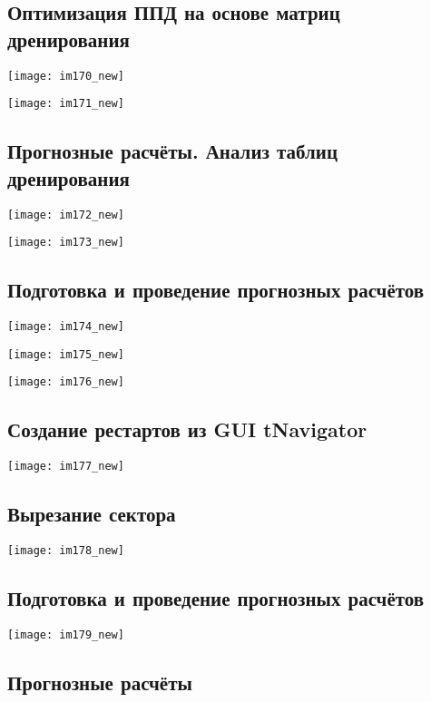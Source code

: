 \documentclass[main.tex]{subfiles}
\begin{document}
\subsection{Оптимизация ППД на основе матриц дренирования}

\texttt{[image: im170\_new]}

\texttt{[image: im171\_new]}

\subsection{Прогнозные расчёты. Анализ таблиц дренирования}

\texttt{[image: im172\_new]}

\texttt{[image: im173\_new]}

\subsection{Подготовка и проведение прогнозных расчётов}

\texttt{[image: im174\_new]}

\texttt{[image: im175\_new]}

\texttt{[image: im176\_new]}

\subsection{Создание рестартов из GUI tNavigator}

\texttt{[image: im177\_new]}

\subsection{Вырезание сектора}

\texttt{[image: im178\_new]}

\subsection{Подготовка и проведение прогнозных расчётов}

\texttt{[image: im179\_new]}

\subsection{Прогнозные расчёты}
\end{document}
